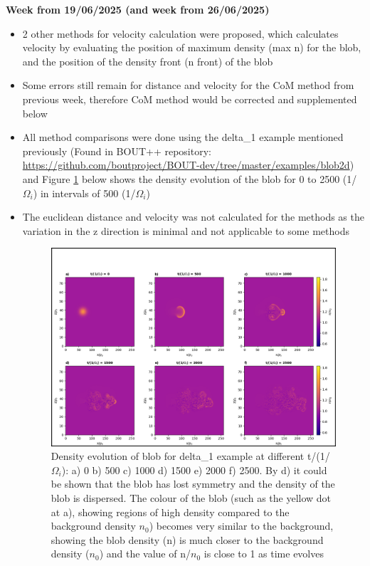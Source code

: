 \documentclass{article}
\begin{document}
\begin{arrowlist}
    \item \textbf{Week from 19/06/2025 (and week from 26/06/2025)}
        \begin{itemize}
            \item 2 other methods for velocity calculation were proposed, which calculates velocity by evaluating the position of maximum density (max n) for the blob, and the position of the density front (n front) of the blob
            \item Some errors still remain for distance and velocity for the CoM method from previous week, therefore CoM method would be corrected and supplemented below
            \item All method comparisons were done using the delta\_1 example mentioned previously (Found in BOUT++ repository: \url{https://github.com/boutproject/BOUT-dev/tree/master/examples/blob2d}) and Figure \ref{fig:fig6} below shows the density evolution of the blob for 0 to 2500 (1/$\Omega_i$) in intervals of 500 (1/$\Omega_i$)
            \item The euclidean distance and velocity was not calculated for the methods as the variation in the z direction is minimal and not applicable to some methods

    \begin{figure}[H]
    \centering
        \includegraphics[width=\textwidth]{./Fig/Fig6 n hmap t0_t50}
        \normalsize{\caption{Density evolution of blob for delta\_1 example at different t/(1/$\Omega_i$): a) 0 b) 500 c) 1000 d) 1500 e) 2000 f) 2500. By d) it could be shown that the blob has lost symmetry and the density of the blob is dispersed. The colour of the blob (such as the yellow dot at a), showing regions of high density compared to the background density $n_0$) becomes very similar to the background, showing the blob density (n) is much closer to the background density ($n_0$) and the value of n/$n_0$ is close to 1 as time evolves}
        \label{fig:fig6}}
    \end{figure}   


\end{itemize}
\end{arrowlist}
\end{document}
